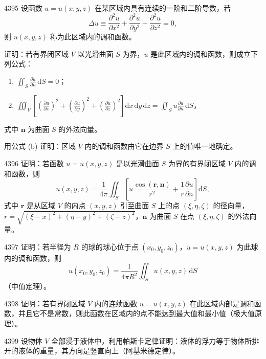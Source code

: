 \begin{prob}[L]{4395}
设函数 $u = u(x,y,z)$ 在某区域内具有连续的一阶和二阶导数，若
\[\Delta u \equiv \frac{\partial^{2} u}{\partial x^{2}} + \frac{\partial^{2} u}{\partial y^{2}} + \frac{\partial^{2} u}{\partial z^{2}} = 0,\]
则 $u(x,y,z)$ 称为此区域内的调和函数。

证明：若有界闭区域 $V$ 以光滑曲面 $S$ 为界，$u$ 是此区域内的调和函数，则成立下列公式：
\begin{enumerate}[label=(\alph*), itemsep=2pt, topsep=3pt]
\item $\displaystyle \iint_{S} \frac{\partial u}{\partial n}\,\mathrm{d}S = 0$；
\item $\displaystyle \iiint_{V} \left[\left(\frac{\partial u}{\partial x}\right)^{2} + \left(\frac{\partial u}{\partial y}\right)^{2} + \left(\frac{\partial u}{\partial z}\right)^{2}\right]\mathrm{d}x\,\mathrm{d}y\,\mathrm{d}z = \iint_{S} u \frac{\partial u}{\partial n}\,\mathrm{d}S$，
\end{enumerate}
式中 $\boldsymbol{n}$ 为曲面 $S$ 的外法向量。

用公式 (b) 证明：区域 $V$ 内的调和函数由它在边界 $S$ 上的值唯一地确定。
\end{prob}

\begin{prob}[M]{4396}
证明：若函数 $u = u(x,y,z)$ 是以光滑曲面 $S$ 为界的有界闭区域 $V$ 内的调和函数，则
\[u(x,y,z) = \frac{1}{4\pi} \iint_{S} \left[u \frac{\cos(\boldsymbol{r}, \boldsymbol{n})}{r^{2}} + \frac{1}{r}\frac{\partial u}{\partial n}\right]\mathrm{d}S,\]
式中 $\boldsymbol{r}$ 是从区域 $V$ 的内点 $(x,y,z)$ 引至曲面 $S$ 上的点 $(\xi, \eta, \zeta)$ 的径向量，$r = \sqrt{(\xi-x)^{2}+(\eta-y)^{2}+(\zeta-z)^{2}}$，$\boldsymbol{n}$ 为曲面 $S$ 在点 $(\xi, \eta, \zeta)$ 的外法向量。
\end{prob}

\begin{prob}[M]{4397}
证明：若半径为 $R$ 的球的球心位于点 $(x_{0}, y_{0}, z_{0})$，$u = u(x,y,z)$ 为此球内的调和函数，则
\[u(x_{0}, y_{0}, z_{0}) = \frac{1}{4\pi R^{2}} \iint_{S} u(x,y,z)\,\mathrm{d}S\]
（中值定理）。
\end{prob}

\begin{prob}[M]{4398}
证明：若有界闭区域 $V$ 内的连续函数 $u = u(x,y,z)$ 在此区域内部是调和函数，并且它不是常数，则此函数在区域内的点不能达到最大值和最小值（极大值原理）。
\end{prob}

\begin{prob}[M]{4399}
设物体 $V$ 全部浸于液体中，利用帕斯卡定律证明：液体的浮力等于物体所排开的液体的重量，其方向是竖直向上（阿基米德定律）。
\end{prob}

